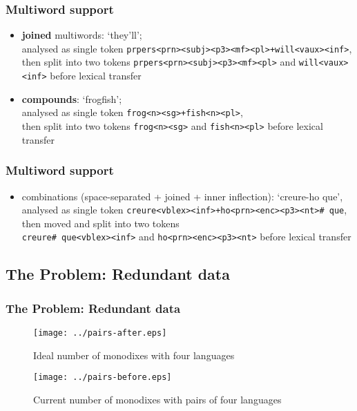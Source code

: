 \documentclass[notes=hide]{beamer}
\newcommand{\ana}[1]{\texttt{#1}}
\newcommand{\form}[1]{`#1'}
\begin{document}
\begin{frame}
  \frametitle{Multiword support}

  \begin{itemize}
  \item \textbf{joined} multiwords: \form{they'll}; \\
    analysed as single token \ana{prpers<prn><subj><p3><mf><pl>+will<vaux><inf>}, \\
    then split into two tokens \ana{prpers<prn><subj><p3><mf><pl>} and
    \ana{will<vaux><inf>} before lexical transfer
  \item \textbf{compounds}: \form{frogfish}; \\
    analysed as single token \ana{frog<n><sg>+fish<n><pl>}, \\
    then split into two tokens \ana{frog<n><sg>} and \ana{fish<n><pl>}
    before lexical transfer
  \end{itemize}
\end{frame}

\begin{frame}
  \frametitle{Multiword support}
  \begin{itemize}
  \item combinations (space-separated + joined + inner inflection):
    \form{creure-ho que},\\
    analysed as single token \ana{creure<vblex><inf>+ho<prn><enc><p3><nt>\# que}, \\
    then moved and split into two tokens \\
    \ana{creure\# que<vblex><inf>} and \ana{ho<prn><enc><p3><nt>}
    before lexical transfer
  \end{itemize}
\end{frame}

\subsection{The Problem: Redundant data}
\begin{frame}
  \frametitle{The Problem: Redundant data}

  \begin{figure}[h]
    \begin{center}
      \texttt{[image: ../pairs-after.eps]}
      \caption{Ideal number of monodixes with four languages}
      \label{fig:monodixes-ideally}
    \end{center}
  \end{figure}

  \begin{figure}[h]
    \begin{center}
      \texttt{[image: ../pairs-before.eps]}
      \caption{Current number of monodixes with pairs of four languages}
      \label{fig:monodixes-current}
    \end{center}
  \end{figure}

\end{frame}
\end{document}
